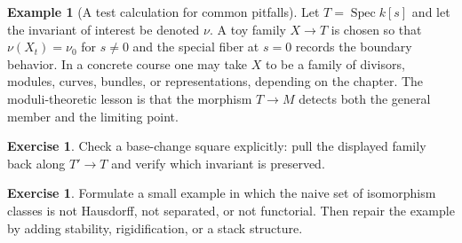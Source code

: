 \documentclass[11pt]{amsart}
\theoremstyle{definition}
\newtheorem{example}[theorem]{Example}
\newtheorem{exercise}[theorem]{Exercise}
\newcommand{\Spec}{\operatorname{Spec}}
\begin{document}
\begin{example}[A test calculation for common pitfalls]
Let $T=\Spec k[s]$ and let the invariant of interest be denoted $\nu$.  A toy family $X\to T$ is chosen so that $\nu(X_t)=\nu_0$ for $s\ne0$ and the special fiber at $s=0$ records the boundary behavior.  In a concrete course one may take $X$ to be a family of divisors, modules, curves, bundles, or representations, depending on the chapter.  The moduli-theoretic lesson is that the morphism $T\to M$ detects both the general member and the limiting point.
\end{example}
\begin{exercise}
Check a base-change square explicitly: pull the displayed family back along $T\prime\to T$ and verify which invariant is preserved.
\end{exercise}
\begin{exercise}
Formulate a small example in which the naive set of isomorphism classes is not Hausdorff, not separated, or not functorial.  Then repair the example by adding stability, rigidification, or a stack structure.
\end{exercise}
\clearpage
\end{document}
